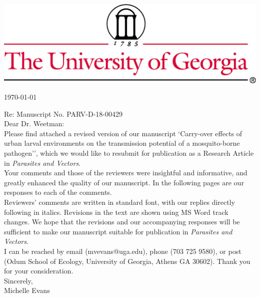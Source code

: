 \documentclass{letter}
\begin{document}

\begin{letter}


\vspace{-2in}
\includegraphics[width=\textwidth]{thin4c.png}

\begin{flushright}
\today
\end{flushright}


Re: Manuscript No. PARV-D-18-00429\\

Dear Dr. Weetman:\\

Please find attached a revised version of our manuscript `Carry-over effects of urban larval environments on the transmission potential of a mosquito-borne pathogen'', which we would like to resubmit for publication as a Research Article in \textit{Parasites and Vectors}.\\

Your comments and those of the reviewers were insightful and informative, and greatly enhanced the quality of our manuscript.  In the following pages are our responses to each of the comments.\\

Reviewers' comments are written in standard font, with our replies directly following in italics. Revisions in the text are shown using MS Word track changes. We hope that the revisions and our accompanying responses will be sufficient to make our manuscript suitable for publication in \textit{Parasites and Vectors}.\\

I can be reached by email (mvevans@uga.edu), phone (703 725 9580), or post (Odum School of Ecology, University of Georgia, Athens GA 30602). Thank you for your consideration. \\

Sincerely,\\
Michelle Evans

\end{letter}
\end{document}
